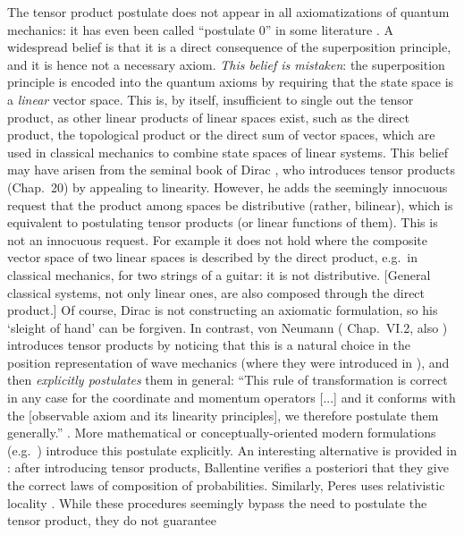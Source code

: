 \documentclass[aps,prl,amsmath,amssymb,twocolumn,nofootinbib]{revtex4}
\theoremstyle{plain}
\theoremstyle{definition}
\theoremstyle{remark}
\begin{document}
	
	The tensor product postulate does not appear in all axiomatizations of
	quantum mechanics: it has even been called ``postulate 0'' in some
	literature \cite{zurek}. A widespread belief is that it is a direct
	consequence of the superposition principle, and it is hence not a
	necessary axiom. {\em This belief is mistaken}: the superposition
	principle is encoded into the quantum axioms by requiring that the
	state space is a {\em linear} vector space. This is, by itself,
	insufficient to single out the tensor product, as other linear
	products of linear spaces exist, such as the direct product, the
	topological product or the direct sum of vector spaces, which are used
	in classical mechanics to combine state spaces of linear systems.
	This belief may have arisen from the seminal book of Dirac
	\cite{diracbook}, who introduces tensor products (Chap.~20) by
	appealing to linearity. However, he adds the seemingly innocuous
	request that the product among spaces be distributive (rather,
	bilinear), which is equivalent to postulating tensor products (or
	linear functions of them). This is not an innocuous request. For
	example it does not hold where the composite vector space of two
	linear spaces is described by the direct product, e.g.~in classical
	mechanics, for two strings of a guitar: it is not distributive.
	[General classical systems, not only linear ones, are also composed
	through the direct product.] Of course, Dirac is not constructing an
	axiomatic formulation, so his `sleight of hand' can be forgiven. In
	contrast, von Neumann (\cite{vonneumannbook} Chap.~VI.2, also
	\cite{jauch}) introduces tensor products by noticing that this is a
	natural choice in the position representation of wave mechanics (where
	they were introduced in \cite{weyl,epr}), and then {\em explicitly
		postulates} them in general: ``This rule of transformation is
	correct in any case for the coordinate and momentum operators [...]
	and it conforms with the [observable axiom and its linearity
	principles], we therefore postulate them generally.''
	\cite{vonneumannbook}.  More mathematical or conceptually-oriented
	modern formulations (e.g.~\cite{ozawa,masanes,wootters,nielsenchuang})
	introduce this postulate explicitly.  An interesting alternative is
	provided in \cite{ballentinebook,ballentinepaper}: after introducing
	tensor products, Ballentine verifies a posteriori that they give the
	correct laws of composition of probabilities. Similarly, Peres uses
	relativistic locality \cite{peres}. While these procedures seemingly
	bypass the need to postulate the tensor product, they do not guarantee
\end{document}
